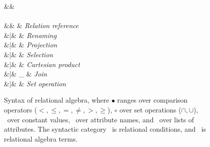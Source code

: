 \begin{figure}

\begin{syntax}


\synDef{\pCond}{\pCondSet}
  &\eqq&  \\
\\[1.5ex]

\synDef{\pQ}{\pQSet}
  &\eqq& \pRel                 & \textit{Relation reference} \\
     &|& \pRen[\pRel]{\pQ}     & \textit{Renaming} \\
     &|& \pPrj[\pAttList]{\pQ} & \textit{Projection} \\
     &|& \pSel\pQ              & \textit{Selection} \\
     &|& \pQ \times \pQ & \textit{Cartesian product}\\
     &|& \pQ \Join_{\pCond} \pQ  & \textit{Join} \\
     &|& \pQ \circ \pQ & \textit{Set operation}\\
\end{syntax}

\caption{Syntax of  relational algebra, where $\bullet$ ranges over
comparison operators ($<, \leq, =, \neq, >, \geq$), $\circ$ over 
set operations ($\cap, \cup$), \cte\ over constant values,
\att\ over attribute names, and \pAttList\ over lists of attributes.
The syntactic category
 \pCond\
is relational conditions, and \pQ\ is  relational algebra terms.
}
\label{fig:rel-alg}
\end{figure}
